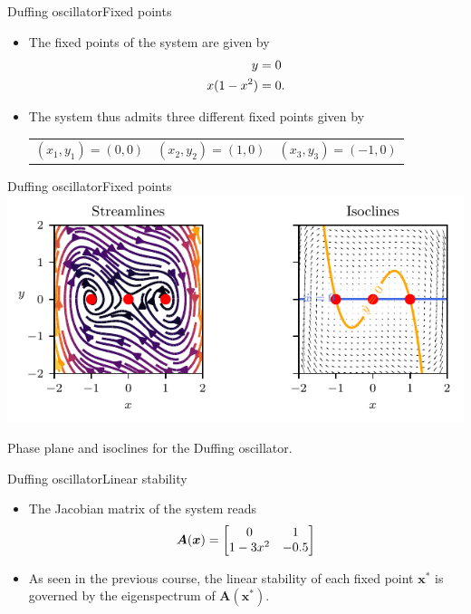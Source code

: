 \documentclass[usenames,dvipsnames,svgnames,10pt,aspectratio=169]{beamer}
\begin{document}
\begin{frame}[t, c]{Duffing oscillator}{Fixed points}
	\begin{itemize}
		\item The fixed points of the system are given by
		\begin{equation}
			\begin{aligned}
				y & = 0 \\
				x(1 - x^2) & = 0.
			\end{aligned}
			\notag
		\end{equation}

		\bigskip

		\item The system thus admits three different fixed points given by
		\medskip
		\begin{center}
			\begin{tabular}{ccc}
				$(x_1, y_1) = (0, 0)$ & $(x_2, y_2) = (1, 0)$ & $(x_3, y_3) = (-1, 0)$
			\end{tabular}
		\end{center}
	\end{itemize}

	\vspace{1cm}
\end{frame}

\begin{frame}[t, c]{Duffing oscillator}{Fixed points}
	\centering
	\includegraphics[width=.75\textwidth]{duffing_phase_plane}

	Phase plane and isoclines for the Duffing oscillator.

	\vspace{1cm}
\end{frame}

\begin{frame}[t, c]{Duffing oscillator}{Linear stability}
	\begin{itemize}
		\item The Jacobian matrix of the system reads
		\begin{equation}
			{\bm A}({\bm x}) = \begin{bmatrix}
									0 & 1 \\
									1 - 3x^2 & -0.5
								\end{bmatrix}
			\notag
		\end{equation}

		\bigskip

		\item As seen in the previous course, the linear stability of each fixed point ${\bm x}^*$ is governed by the eigenspectrum of ${\bm A}({\bm x}^*)$.
	\end{itemize}

	\vspace{1cm}
\end{frame}
\end{document}
